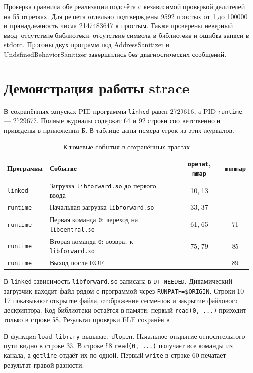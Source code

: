 \documentclass[12pt,a4paper]{article}
\begin{document}
Проверка сравнила обе реализации подсчёта с независимой проверкой делителей на 55 отрезках. Для решета отдельно подтверждены 9592 простых от 1 до 100000 и принадлежность числа 2147483647 к простым. Также проверены неверный ввод, отсутствие библиотеки, отсутствие символа в библиотеке и ошибка записи в stdout. Прогоны двух программ под AddressSanitizer и UndefinedBehaviorSanitizer завершились без диагностических сообщений.

\clearpage
\begingroup
\setlength{\emergencystretch}{3em}
\section{Демонстрация работы strace}
В сохранённых запусках PID программы \texttt{linked} равен 2729616, а PID \texttt{runtime} --- 2729673. Полные журналы содержат 64 и 92 строки соответственно и приведены в приложении Б. В таблице даны номера строк из этих журналов.

\begin{table}[H]
\caption{Ключевые события в сохранённых трассах}
\centering\small
\begin{tabular}{|l|l|c|c|}\hline
Программа & Событие & \texttt{openat}, \texttt{mmap} & \texttt{munmap} \\ \hline
\texttt{linked} & Загрузка \texttt{libforward.so} до первого ввода & 10, 13 & \\ \hline
\texttt{runtime} & Начальная загрузка \texttt{libforward.so} & 33, 37 & \\ \hline
\texttt{runtime} & Первая команда \texttt{0}: переход на \texttt{libcentral.so} & 61, 65 & 71 \\ \hline
\texttt{runtime} & Вторая команда \texttt{0}: возврат к \texttt{libforward.so} & 75, 79 & 85 \\ \hline
\texttt{runtime} & Выход после EOF & & 89 \\ \hline
\end{tabular}
\end{table}

В \texttt{linked} зависимость \texttt{libforward.so} записана в \texttt{DT\_NEEDED}. Динамический загрузчик находит файл рядом с программой через \texttt{RUNPATH=\$ORIGIN}. Строки 10--17 показывают открытие файла, отображение сегментов и закрытие файлового дескриптора. Код библиотеки остаётся в памяти: первый \texttt{read(0, ...)} приходит только в строке 58. Результат проверки ELF сохранён в .

В  функция \texttt{load\_library} вызывает \texttt{dlopen}. Начальное открытие относительного пути видно в строке 33. В строке 58 \texttt{read(0, ...)} получает все команды из канала, а \texttt{getline} отдаёт их по одной. Первый \texttt{write} в строке 60 печатает результат правой разности.
\end{document}
